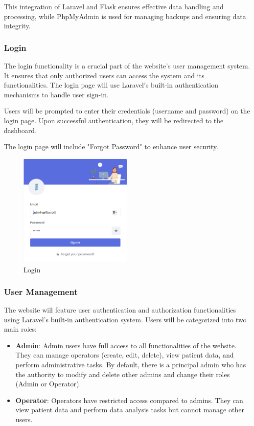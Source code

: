 \documentclass{article}
\begin{document}
This integration of Laravel and Flask ensures effective data handling and processing, while PhpMyAdmin is used for managing backups and ensuring data integrity.


\subsubsection{Login}
The login functionality is a crucial part of the website's user management system. It ensures that only authorized users can access the system and its functionalities. The login page will use Laravel's built-in authentication mechanisms to handle user sign-in.

Users will be prompted to enter their credentials (username and password) on the login page. Upon successful authentication, they will be redirected to the dashboard.

The login page will include "Forgot Password" to enhance user security.

\begin{figure}[h!]
    \centering
    \includegraphics[width=0.5\textwidth]{Images/Web/login.png}
    \caption{Login}
    \label{fig:login_screen}
\end{figure}

\pagebreak

\subsubsection{User Management}
The website will feature user authentication and authorization functionalities using Laravel's built-in authentication system. Users will be categorized into two main roles:

\begin{itemize}
    \item \textbf{Admin}: Admin users have full access to all functionalities of the website. They can manage operators (create, edit, delete), view patient data, and perform administrative tasks. By default, there is a principal admin who has the authority to modify and delete other admins and change their roles (Admin or Operator).
    \item \textbf{Operator}: Operators have restricted access compared to admins. They can view patient data and perform data analysis tasks but cannot manage other users.
\end{itemize}
\end{document}
